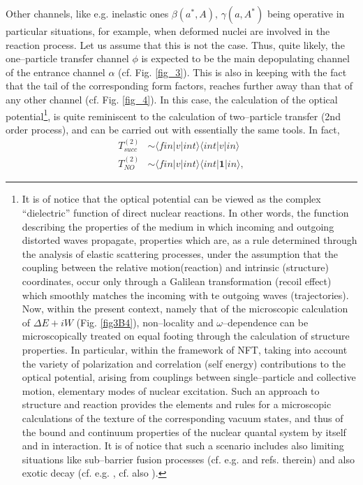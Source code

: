 Other channels, like e.g. inelastic ones $\beta(a^*,A),\,\gamma(a,A^*)$ being operative in particular situations, for example, when deformed nuclei are involved in the reaction process. Let us assume that this is not the case. Thus, quite likely, the one--particle transfer channel $\phi$ is expected to be the main depopulating channel of the entrance channel $\alpha$ (cf. Fig. \ref{fig_3}). This is also in keeping with the fact that the tail of the corresponding form factors, reaches further away than that of any other channel (cf. Fig. \ref{fig_4}). In this case, the calculation of the optical potential\footnote{It is of notice that the optical potential can be viewed as the complex ``dielectric'' function of direct nuclear reactions. In other words, the function describing the properties of the medium  in which incoming and outgoing distorted waves propagate, properties which are, as a rule determined through the analysis of elastic scattering processes, under the assumption that the coupling between the relative motion(reaction) and intrinsic (structure) coordinates, occur only  through a Galilean transformation (recoil effect) which smoothly matches the incoming with te outgoing waves (trajectories). Now, within the present context, namely that of the microscopic calculation of $\Delta E+iW$ (Fig. \ref{fig3B4}), non--locality and $\omega$--dependence can be microscopically treated on equal footing through the calculation of structure properties. In particular, within the framework of NFT, taking into account the variety of polarization and correlation (self energy) contributions to the optical potential, arising from  couplings between single--particle and collective motion, elementary modes of nuclear excitation. Such an approach to structure and reaction provides the elements and rules for  a microscopic calculations of the texture of the corresponding vacuum states, and thus of the bound and continuum properties of the nuclear quantal system by itself and in interaction. It is of notice that such a scenario includes also limiting situations like sub--barrier fusion processes (cf. e.g. \cite{Sargsyan:13} and refs. therein) and also exotic decay (cf. e.g. \cite{Barranco:88,Barranco:90,Montanari:14},  cf. also \cite{Brink:05}).}, is quite reminiscent to the calculation of two--particle transfer (2nd order process), and can be carried out with essentially the same tools. In fact,
\begin{equation}
\begin{split}
T^{(2)}_{succ}&\sim \langle fin|v|int\rangle\langle int |v|in\rangle\\
T^{(2)}_{NO}&\sim \langle fin|v|int\rangle\langle int |\mathbf{1}|in\rangle,
\end{split}
\end{equation}
